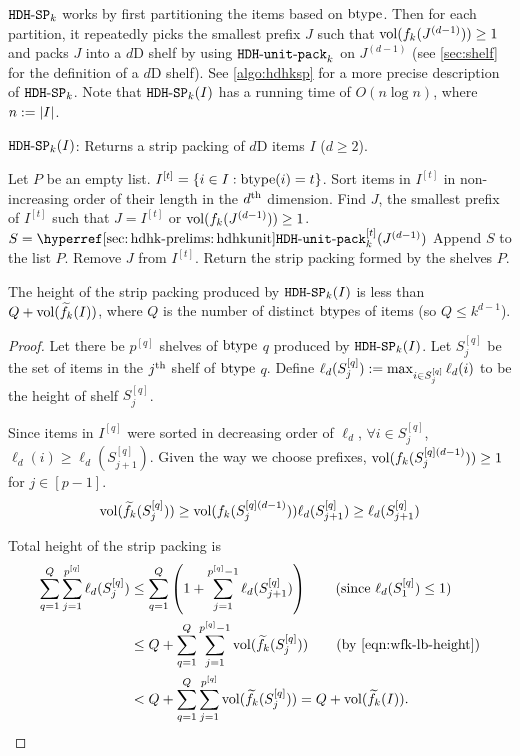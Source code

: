$\operatorname{\mathtt{HDH-SP}}_{k}$ works by first partitioning the items based on $\operatorname{btype}$.
Then for each partition, it repeatedly picks the smallest prefix $J$
such that $\operatorname{vol}(f_k(J^{(d-1)})) \ge 1$ and packs $J$ into a $d$D shelf
by using $\operatorname{\mathtt{HDH-unit-pack}}_{k}$ on $J^{(d-1)}$
(see \cref{sec:shelf} for the definition of a $d$D shelf).
See \cref{algo:hdhksp} for a more precise description of $\operatorname{\mathtt{HDH-SP}}_{k}$.
Note that $\operatorname{\mathtt{HDH-SP}}_{k}(I)$ has a running time of $O(n\log n)$, where $n := |I|$.

\begin{algorithm}[!ht]
\caption{$\operatorname{\mathtt{HDH-SP}}_{k}(I)$:
Returns a strip packing of $d$D items $I$ ($d \ge 2$).}
\label{algo:hdhksp}
\begin{algorithmic}[1]
\State Let $P$ be an empty list.
    \State $I^{[t]} = \{i \in I: \operatorname{btype}(i) = t\}$.
    \State Sort items in $I^{[t]}$ in non-increasing order of their length in the $d^{\textrm{th}}$ dimension.
        \State Find $J$, the smallest prefix of $I^{[t]}$ such that
            $J = I^{[t]}$ or $\operatorname{vol}(f_k(J^{(d-1)})) \ge 1$.
        \State $S = \hdhkunitHyp^{[t]}(J^{(d-1)})$
        \State Append $S$ to the list $P$.
        \State Remove $J$ from $I^{[t]}$.
    \EndWhile
\EndFor
\State Return the strip packing formed by the shelves $P$.
\end{algorithmic}
\end{algorithm}

\begin{theorem}
\label{thm:hdhk-fvol}
The height of the strip packing produced by $\operatorname{\mathtt{HDH-SP}}_{k}(I)$ is less than $Q + \operatorname{vol}(\widetilde{f}_{k}(I))$,
where $Q$ is the number of distinct $\operatorname{btype}$s of items (so $Q \le k^{d-1}$).
\end{theorem}
\begin{proof}
Let there be $p^{[q]}$ shelves of $\operatorname{btype}$ $q$ produced by $\operatorname{\mathtt{HDH-SP}}_{k}(I)$.
Let $S_j^{[q]}$ be the set of items in the $j^{\textrm{th}}$ shelf of $\operatorname{btype}$ $q$.
Define $\ell_d(S_j^{[q]}) := \max_{i \in S_j^{[q]}} \ell_d(i)$
to be the height of shelf $S_j^{[q]}$.

Since items in $I^{[q]}$ were sorted in decreasing order of $\ell_d$,
$\forall i \in S_j^{[q]}$, $\ell_d(i) \ge \ell_d(S_{j+1}^{[q]})$.
Given the way we choose prefixes, $\operatorname{vol}(f_k(S_j^{[q] (d-1)})) \ge 1$ for $j \in [p-1]$.
\begin{equation}
\label{eqn:wfk-lb-height}
\operatorname{vol}(\widetilde{f}_{k}(S_j^{[q]}))
\ge \operatorname{vol}(f_k(S_j^{[q] (d-1)}))\ell_d(S_{j+1}^{[q]})
\ge \ell_d(S_{j+1}^{[q]})
\end{equation}

Total height of the strip packing is
\begin{align*}
\sum_{q=1}^Q \sum_{j=1}^{p^{[q]}} \ell_d(S_j^{[q]})
&\le \sum_{q=1}^Q \left(1 + \sum_{j=1}^{p^{[q]}-1} \ell_d(S_{j+1}^{[q]})\right)
\tag{since $\ell_d(S_1^{[q]}) \le 1$}
\\ &\le Q + \sum_{q=1}^Q \sum_{j=1}^{p^{[q]}-1} \vol(\wfk(S_j^{[q]}))
\tag{by \eqref{eqn:wfk-lb-height}}
\\ &< Q + \sum_{q=1}^Q \sum_{j=1}^{p^{[q]}} \vol(\wfk(S_j^{[q]}))
= Q + \vol(\wfk(I)).
\qedhere \end{align*}
\end{proof}

